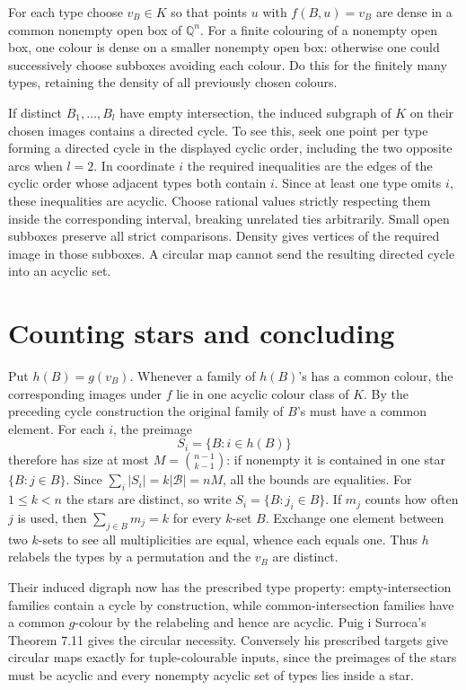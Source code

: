 \documentclass[11pt]{article}
\begin{document}
For each type choose $v_B\in K$ so that points $u$ with $f(B,u)=v_B$ are dense in a common nonempty open box of $\mathbb Q^n$. For a finite colouring of a nonempty open box, one colour is dense on a smaller nonempty open box: otherwise one could successively choose subboxes avoiding each colour. Do this for the finitely many types, retaining the density of all previously chosen colours.

If distinct $B_1,\ldots,B_l$ have empty intersection, the induced subgraph of $K$ on their chosen images contains a directed cycle. To see this, seek one point per type forming a directed cycle in the displayed cyclic order, including the two opposite arcs when $l=2$. In coordinate $i$ the required inequalities are the edges of the cyclic order whose adjacent types both contain $i$. Since at least one type omits $i$, these inequalities are acyclic. Choose rational values strictly respecting them inside the corresponding interval, breaking unrelated ties arbitrarily. Small open subboxes preserve all strict comparisons. Density gives vertices of the required image in those subboxes. A circular map cannot send the resulting directed cycle into an acyclic set.

\section{Counting stars and concluding}
Put $h(B)=g(v_B)$. Whenever a family of $h(B)$'s has a common colour, the corresponding images under $f$ lie in one acyclic colour class of $K$. By the preceding cycle construction the original family of $B$'s must have a common element. For each $i$, the preimage
\[
 S_i=\{B:i\in h(B)\}
\]
therefore has size at most $M=\binom{n-1}{k-1}$: if nonempty it is contained in one star $\{B:j\in B\}$. Since $\sum_i|S_i|=k|\mathcal B|=nM$, all the bounds are equalities. For $1\le k<n$ the stars are distinct, so write $S_i=\{B:j_i\in B\}$. If $m_j$ counts how often $j$ is used, then $\sum_{j\in B}m_j=k$ for every $k$-set $B$. Exchange one element between two $k$-sets to see all multiplicities are equal, whence each equals one. Thus $h$ relabels the types by a permutation and the $v_B$ are distinct.

Their induced digraph now has the prescribed type property: empty-intersection families contain a cycle by construction, while common-intersection families have a common $g$-colour by the relabeling and hence are acyclic. Puig i Surroca's Theorem 7.11 gives the circular necessity. Conversely his prescribed targets give circular maps exactly for tuple-colourable inputs, since the preimages of the stars must be acyclic and every nonempty acyclic set of types lies inside a star.
\end{document}
